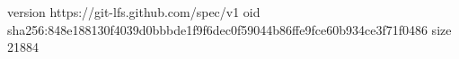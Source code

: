 version https://git-lfs.github.com/spec/v1
oid sha256:848e188130f4039d0bbbde1f9f6dec0f59044b86ffe9fce60b934ce3f71f0486
size 21884
